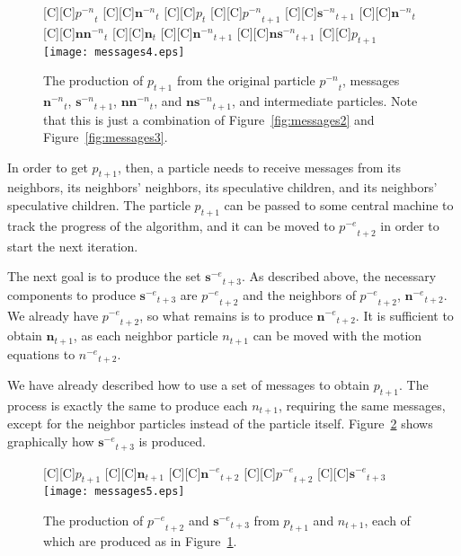 \documentclass[letterpaper]{sig-alt-release2}
\newcommand{\fig}[1]{Figure~\ref{fig:#1}}
\providecommand{\noeval}[1]{\ensuremath{#1^{-e}}}
\providecommand{\nonbest}[1]{\ensuremath{#1^{-n}}}
\providecommand{\p}{\ensuremath{p}}
\providecommand{\sset}{\ensuremath{\mathbf{s}}}
\providecommand{\nsset}{\ensuremath{\mathbf{ns}}}
\providecommand{\n}{\ensuremath{n}}
\providecommand{\nset}{\ensuremath{\mathbf{n}}}
\providecommand{\nnset}{\ensuremath{\mathbf{nn}}}
\begin{document}
\begin{figure}
  \centering
  [C][C]{$\nonbest{\p}_{t}$}
  [C][C]{$\nonbest{\nset}_{t}$}
  [C][C]{$\p_{t}$}
  [C][C]{$\nonbest{\p}_{t+1}$}
  [C][C]{$\nonbest{\sset}_{t+1}$}
  [C][C]{$\nonbest{\nset}_{t}$}
  [C][C]{$\nonbest{\nnset}_{t}$}
  [C][C]{$\nset_{t}$}
  [C][C]{$\nonbest{\nset}_{t+1}$}
  [C][C]{$\nonbest{\nsset}_{t+1}$}
  [C][C]{$\p_{t+1}$}
  \texttt{[image: messages4.eps]}
  \caption{The production of $\p_{t+1}$ from the original particle 
  $\nonbest{\p}_{t}$, messages $\nonbest{\nset}_{t}$, $\nonbest{\sset}_{t+1}$,
  $\nonbest{\nnset}_{t}$, and $\nonbest{\nsset}_{t+1}$, and intermediate
  particles.  Note that this is just a combination of \fig{messages2} and
  \fig{messages3}.}
  \label{fig:messages4}
\end{figure}

In order to get $\p_{t+1}$, then, a particle needs to receive messages from its
neighbors, its neighbors' neighbors, its speculative children, and its
neighbors' speculative children.  The particle $\p_{t+1}$ can be passed to some
central machine to track the progress of the algorithm, and it can be moved to
$\noeval{\p}_{t+2}$ in order to start the next iteration.

The next goal is to produce the set $\noeval{\sset}_{t+3}$.  As described
above, the necessary components to produce $\noeval{\sset}_{t+3}$ are
$\noeval{\p}_{t+2}$ and the neighbors of $\noeval{\p}_{t+2}$,
$\noeval{\nset}_{t+2}$.  We already have $\noeval{\p}_{t+2}$, so what remains
is to produce $\noeval{\nset}_{t+2}$.  It is sufficient to obtain
$\nset_{t+1}$, as each neighbor particle $\n_{t+1}$ can be moved with the
motion equations to $\noeval{\n}_{t+2}$.

We have already described how to use a set of messages to obtain $\p_{t+1}$.
The process is exactly the same to produce each $\n_{t+1}$, requiring the same
messages, except for the neighbor particles instead of the particle itself.  
\fig{messages5} shows graphically how $\noeval{\sset}_{t+3}$ is produced.

\begin{figure}
  \centering
  [C][C]{$\p_{t+1}$}
  [C][C]{$\nset_{t+1}$}
  [C][C]{$\noeval{\nset}_{t+2}$}
  [C][C]{$\noeval{\p}_{t+2}$}
  [C][C]{$\noeval{\sset}_{t+3}$}
  \texttt{[image: messages5.eps]}
  \caption{The production of $\noeval{\p}_{t+2}$ and $\noeval{\sset}_{t+3}$
  from $\p_{t+1}$ and $\n_{t+1}$, each of which are produced as in
  \fig{messages4}.}
  \label{fig:messages5}
\end{figure}
\end{document}
